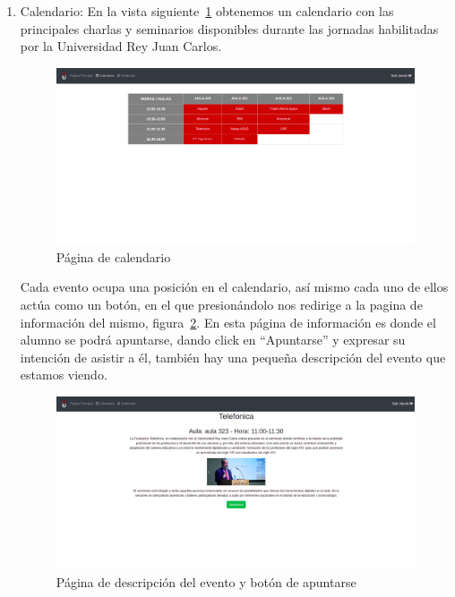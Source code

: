 \documentclass[a4paper, 12pt]{book}
\begin{document}
\begin{enumerate}
 \vspace{12cm}
  \item Calendario: En la vista siguiente~\ref{fig:horario} obtenemos un calendario con las principales charlas y seminarios disponibles durante las jornadas habilitadas por la Universidad Rey Juan Carlos. 

\begin{figure}[h!]
  	\centering
  	\includegraphics[width=16cm, keepaspectratio]{img/horario.png}
  	\caption{Página de calendario}\label{fig:horario}
	\end{figure}
  
  Cada evento ocupa una posición en el calendario, así mismo cada uno de ellos actúa como un botón, en el que presionándolo nos redirige a la pagina de información del mismo, figura~\ref{fig:descripEvento}. En esta página de información es donde el alumno se podrá apuntarse, dando click en ``Apuntarse'' y expresar su intención de asistir a él, también hay una pequeña descripción del evento que estamos viendo.
  
  \begin{figure}[h!]
  	\centering
  	\includegraphics[width=16cm, keepaspectratio]{img/descripEvento.png}
  	\caption{Página de descripción del evento y botón de apuntarse}\label{fig:descripEvento}
	\end{figure}
  

\end{enumerate}
\end{document}
